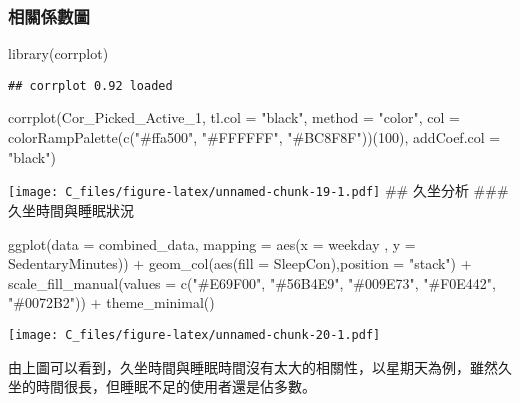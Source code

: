 \documentclass[
]{article}
\newenvironment{Shaded}{\begin{snugshade}}{\end{snugshade}}
\newcommand{\AttributeTok}[1]{\textcolor[rgb]{0.77,0.63,0.00}{#1}}
\newcommand{\DecValTok}[1]{\textcolor[rgb]{0.00,0.00,0.81}{#1}}
\newcommand{\FunctionTok}[1]{\textcolor[rgb]{0.00,0.00,0.00}{#1}}
\newcommand{\NormalTok}[1]{#1}
\newcommand{\SpecialCharTok}[1]{\textcolor[rgb]{0.00,0.00,0.00}{#1}}
\newcommand{\StringTok}[1]{\textcolor[rgb]{0.31,0.60,0.02}{#1}}
\begin{document}
\hypertarget{ux76f8ux95dcux4fc2ux6578ux5716}{%
\subsubsection{相關係數圖}\label{ux76f8ux95dcux4fc2ux6578ux5716}}

\begin{Shaded}
\begin{Highlighting}[]
\FunctionTok{library}\NormalTok{(corrplot)}
\end{Highlighting}
\end{Shaded}

\begin{verbatim}
## corrplot 0.92 loaded
\end{verbatim}

\begin{Shaded}
\begin{Highlighting}[]
\FunctionTok{corrplot}\NormalTok{(Cor\_Picked\_Active\_1,}
         \AttributeTok{tl.col =} \StringTok{"black"}\NormalTok{,}
         \AttributeTok{method =} \StringTok{"color"}\NormalTok{,}
         \AttributeTok{col =} \FunctionTok{colorRampPalette}\NormalTok{(}\FunctionTok{c}\NormalTok{(}\StringTok{"\#ffa500"}\NormalTok{, }\StringTok{"\#FFFFFF"}\NormalTok{, }\StringTok{"\#BC8F8F"}\NormalTok{))(}\DecValTok{100}\NormalTok{),}
         \AttributeTok{addCoef.col =} \StringTok{"black"}\NormalTok{)}
\end{Highlighting}
\end{Shaded}

\texttt{[image: C\_files/figure-latex/unnamed-chunk-19-1.pdf]} \#\#
久坐分析 \#\#\# 久坐時間與睡眠狀況

\begin{Shaded}
\begin{Highlighting}[]
\FunctionTok{ggplot}\NormalTok{(}\AttributeTok{data =}\NormalTok{ combined\_data, }\AttributeTok{mapping =} \FunctionTok{aes}\NormalTok{(}\AttributeTok{x =}\NormalTok{ weekday , }\AttributeTok{y =}\NormalTok{ SedentaryMinutes)) }\SpecialCharTok{+} 
  \FunctionTok{geom\_col}\NormalTok{(}\FunctionTok{aes}\NormalTok{(}\AttributeTok{fill =}\NormalTok{ SleepCon),}\AttributeTok{position =} \StringTok{"stack"}\NormalTok{) }\SpecialCharTok{+}
  \FunctionTok{scale\_fill\_manual}\NormalTok{(}\AttributeTok{values =} \FunctionTok{c}\NormalTok{(}\StringTok{"\#E69F00"}\NormalTok{, }\StringTok{"\#56B4E9"}\NormalTok{, }\StringTok{"\#009E73"}\NormalTok{, }\StringTok{"\#F0E442"}\NormalTok{, }\StringTok{"\#0072B2"}\NormalTok{)) }\SpecialCharTok{+} 
  \FunctionTok{theme\_minimal}\NormalTok{()}
\end{Highlighting}
\end{Shaded}

\texttt{[image: C\_files/figure-latex/unnamed-chunk-20-1.pdf]}

由上圖可以看到，久坐時間與睡眠時間沒有太大的相關性，以星期天為例，雖然久坐的時間很長，但睡眠不足的使用者還是佔多數。
\end{document}
